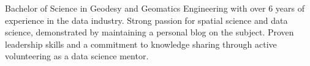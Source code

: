 Bachelor of Science in Geodesy and Geomatics Engineering with over 6 years of experience in the data industry. Strong passion for spatial science and data science, demonstrated by maintaining a personal blog on the subject. Proven leadership skills and a commitment to knowledge sharing through active volunteering as a data science mentor.